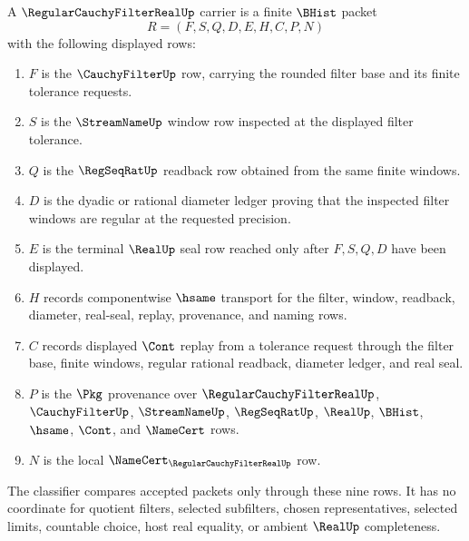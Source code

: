 \begin{definition}
\label{def:regular-cauchy-filter-real-carrier}
A $\RegularCauchyFilterRealUp$ carrier is a finite $\BHist$ packet
$$
R=(F,S,Q,D,E,H,C,P,N)
$$
with the following displayed rows:
\begin{enumerate}
\item $F$ is the $\CauchyFilterUp$ row, carrying the rounded filter base and its finite tolerance requests.
\item $S$ is the $\StreamNameUp$ window row inspected at the displayed filter tolerance.
\item $Q$ is the $\RegSeqRatUp$ readback row obtained from the same finite windows.
\item $D$ is the dyadic or rational diameter ledger proving that the inspected filter windows are regular at the requested precision.
\item $E$ is the terminal $\RealUp$ seal row reached only after $F,S,Q,D$ have been displayed.
\item $H$ records componentwise $\hsame$ transport for the filter, window, readback, diameter, real-seal, replay, provenance, and naming rows.
\item $C$ records displayed $\Cont$ replay from a tolerance request through the filter base, finite windows, regular rational readback, diameter ledger, and real seal.
\item $P$ is the $\Pkg$ provenance over $\RegularCauchyFilterRealUp$, $\CauchyFilterUp$, $\StreamNameUp$, $\RegSeqRatUp$, $\RealUp$, $\BHist$, $\hsame$, $\Cont$, and $\NameCert$ rows.
\item $N$ is the local $\NameCert_{\RegularCauchyFilterRealUp}$ row.
\end{enumerate}
The classifier compares accepted packets only through these nine rows. It has no coordinate for quotient filters, selected subfilters, chosen representatives, selected limits, countable choice, host real equality, or ambient $\RealUp$ completeness.
\end{definition}

